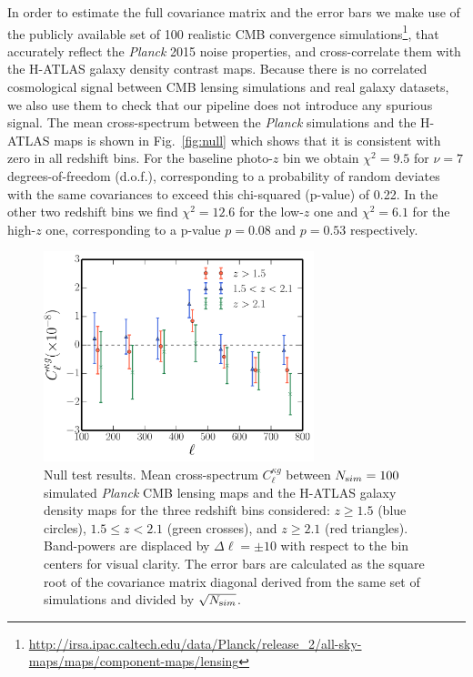 In order to estimate the full covariance matrix and the error bars we make use of the publicly available set of 100 realistic CMB convergence
simulations\footnote{\url{http://irsa.ipac.caltech.edu/data/Planck/release_2/all-sky-maps/maps/component-maps/lensing}}, that accurately reflect the \emph{Planck} 2015 noise properties, and cross-correlate them with the H-ATLAS galaxy density contrast maps. Because there is no correlated cosmological signal between CMB lensing simulations and real galaxy datasets, we also use them to check that our pipeline does not introduce any spurious signal. The mean cross-spectrum between the \emph{Planck} simulations and the H-ATLAS maps is shown in Fig.~\eqref{fig:null} which shows that it is consistent with zero in all redshift bins. For the baseline photo-$z$ bin we obtain $\chi^2 = 9.5$ for $\nu=7$ degrees-of-freedom (d.o.f.), corresponding to a probability of random deviates with the same covariances to exceed this chi-squared (p-value) of 0.22. In the other two redshift bins we find $\chi^2=12.6$ for the low-$z$ one and $\chi^2=6.1$ for the high-$z$ one, corresponding to a p-value $p=0.08$ and $p=0.53$ respectively.


%
\begin{figure} %
\centering %
\includegraphics[width=0.7\textwidth]{Chapter4/Images/kg_null_test_planck_sims_2015_ALL_SMM_35mJy}
\caption{Null test results. Mean cross-spectrum $C^{\kappa g}_{\ell}$ between $N_{\rm sim}=100$ simulated \emph{Planck} CMB lensing maps and
the H-ATLAS galaxy density maps for the three redshift bins considered: $z \ge 1.5$ (blue circles), $1.5 \le z < 2.1$ (green crosses), and
$z \ge 2.1$ (red triangles). Band-powers are displaced by $\Delta\ell = \pm 10$ with respect to the bin centers for visual clarity. The error bars are calculated as the square root of the covariance matrix diagonal derived from the same set of simulations and divided by $\sqrt{N_{\rm sim}}$.  \label{fig:null}}
\end{figure}
%


